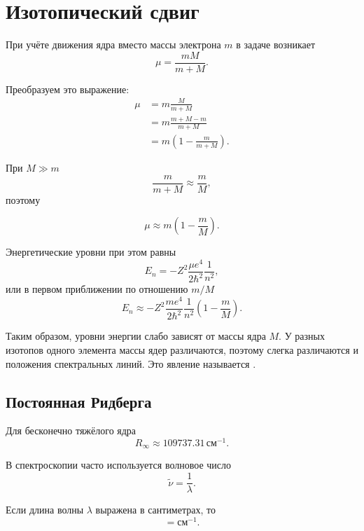 \documentclass[../final.tex]{subfiles}
\begin{document}
\section{Изотопический сдвиг}

При учёте движения ядра вместо массы электрона $m$ в задаче возникает
%
\begin{equation*}
    \mu
    =
    \frac{mM}{m+M}.
\end{equation*}

Преобразуем это выражение:
%
\begin{align*}
    \mu
    &=
    m\frac{M}{m+M}
    \\[3pt]
    &=
    m\frac{m+M-m}{m+M}
    \\[3pt]
    &=
    m
    \left(
        1-\frac{m}{m+M}
    \right).
\end{align*}

При $M\gg m$
%
\begin{equation*}
    \frac{m}{m+M}
    \approx
    \frac{m}{M},
\end{equation*}
%
поэтому

\[
    \mu
    \approx
    m
    \left(
        1-\frac{m}{M}
    \right).
\]

Энергетические уровни при этом равны
%
\begin{equation*}
    E_n
    =
    -Z^2
    \frac{\mu e^4}{2\hbar^2}
    \frac{1}{n^2},
\end{equation*}
%
или в первом приближении по отношению $m/M$
%
\begin{equation*}
    E_n
    \approx
    -Z^2
    \frac{me^4}{2\hbar^2}
    \frac{1}{n^2}
    \left(
        1-\frac{m}{M}
    \right).
\end{equation*}

Таким образом, уровни энергии слабо зависят от массы ядра $M$.
У разных изотопов одного элемента массы ядер различаются, поэтому
слегка различаются и положения спектральных линий. Это явление
называется .


\subsection{Постоянная Ридберга}

Для бесконечно тяжёлого ядра
%
\begin{equation*}
    R_{\infty}
    \approx
    109737.31\,\text{см}^{-1}.
\end{equation*}

В спектроскопии часто используется волновое число
%
\begin{equation*}
    \widetilde{\nu}
    =
    \frac{1}{\lambda}.
\end{equation*}

Если длина волны $\lambda$ выражена в сантиметрах, то
%
\begin{equation*}
    [\widetilde{\nu}]
    =
    \text{см}^{-1}.
\end{equation*}
\end{document}
